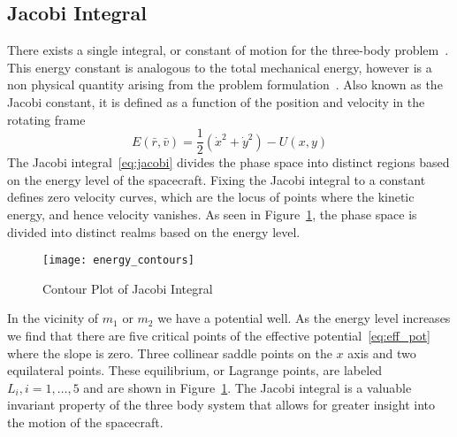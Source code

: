 \documentclass[letterpaper, preprint, paper,11pt]{AAS}	%
\begin{document}
\subsection{Jacobi Integral}
There exists a single integral, or constant of motion for the three-body problem~\cite{lanczos1970,szebehely1967}.
This energy constant is analogous to the total mechanical energy, however is a non physical quantity arising from the problem formulation~\cite{szebehely1967}.
Also known as the Jacobi constant, it is defined as a function of the position and velocity in the rotating frame
\begin{equation}
	E\left( \bar{r} , \bar{v} \right) = \frac{1}{2}\left( \dot{x}^2 + \dot{y}^2\right) - U\left(x,y \right)
	\label{eq:jacobi}
\end{equation}
The Jacobi integral~\cref{eq:jacobi} divides the phase space into distinct regions based on the energy level of the spacecraft.
Fixing the Jacobi integral to a constant defines zero velocity curves, which are the locus of points where the kinetic energy, and hence velocity vanishes.
As seen in Figure~\ref{fig:energy_contour}, the phase space is divided into distinct realms based on the energy level.
\begin{figure}[htbp]
	\centering
	\texttt{[image: energy\_contours]}
	\caption{Contour Plot of Jacobi Integral}
	\label{fig:energy_contour}
\end{figure} 
In the vicinity of \( m_1\) or \(m_2\) we have a potential well. 
As the energy level increases we find that there are five critical points of the effective potential~\cref{eq:eff_pot} where the slope is zero.
Three collinear saddle points on the \(x\) axis and two equilateral points.
These equilibrium, or Lagrange points, are labeled \( L_i, i = 1, \hdots, 5 \) and are shown in Figure~\ref{fig:energy_contour}.
The Jacobi integral is a valuable invariant property of the three body system that allows for greater insight into the motion of the spacecraft.

\end{document}
